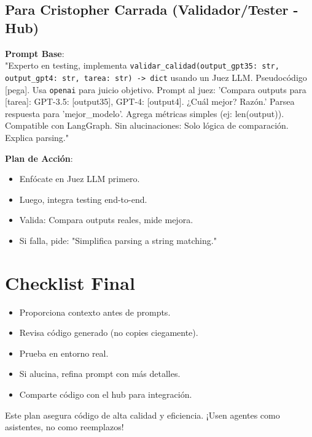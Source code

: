 \documentclass{article}
\begin{document}
\subsection{Para Cristopher Carrada (Validador/Tester - Hub)}

\textbf{Prompt Base}: \\
"Experto en testing, implementa \texttt{validar\_calidad(output\_gpt35: str, output\_gpt4: str, tarea: str) -> dict} usando un Juez LLM. Pseudocódigo [pega]. Usa \texttt{openai} para juicio objetivo. Prompt al juez: 'Compara outputs para [tarea]: GPT-3.5: [output35], GPT-4: [output4]. ¿Cuál mejor? Razón.' Parsea respuesta para 'mejor\_modelo'. Agrega métricas simples (ej: len(output)). Compatible con LangGraph. Sin alucinaciones: Solo lógica de comparación. Explica parsing."

\textbf{Plan de Acción}:
\begin{itemize}
    \item Enfócate en Juez LLM primero.
    \item Luego, integra testing end-to-end.
    \item Valida: Compara outputs reales, mide mejora.
    \item Si falla, pide: "Simplifica parsing a string matching."
\end{itemize}

\section{Checklist Final}

\begin{itemize}
    \item [ ] Proporciona contexto antes de prompts.
    \item [ ] Revisa código generado (no copies ciegamente).
    \item [ ] Prueba en entorno real.
    \item [ ] Si alucina, refina prompt con más detalles.
    \item [ ] Comparte código con el hub para integración.
\end{itemize}

Este plan asegura código de alta calidad y eficiencia. ¡Usen agentes como asistentes, no como reemplazos!
\end{document}
